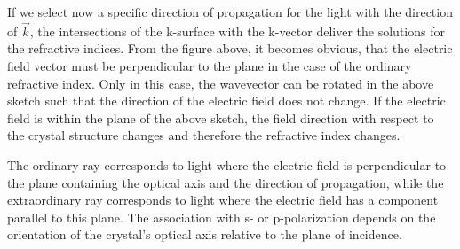 \documentclass[
  a4paper,
]{book}
\begin{document}
If we select now a specific direction of propagation for the light with
the direction of \(\vec{k}\), the intersections of the k-surface with
the k-vector deliver the solutions for the refractive indices. From the
figure above, it becomes obvious, that the electric field vector must be
perpendicular to the plane in the case of the ordinary refractive index.
Only in this case, the wavevector can be rotated in the above sketch
such that the direction of the electric field does not change. If the
electric field is within the plane of the above sketch, the field
direction with respect to the crystal structure changes and therefore
the refractive index changes.

The ordinary ray corresponds to light where the electric field is
perpendicular to the plane containing the optical axis and the direction
of propagation, while the extraordinary ray corresponds to light where
the electric field has a component parallel to this plane. The
association with s- or p-polarization depends on the orientation of the
crystal's optical axis relative to the plane of incidence.
\end{document}
